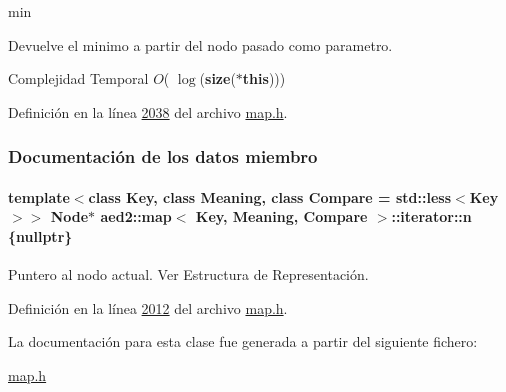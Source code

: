 min 

Devuelve el minimo a partir del nodo pasado como parametro.


\begin{DoxyDescription}
\item[Complejidad Temporal]$O$( $\log$({\bfseries size}({\bfseries $\ast$this})))
\end{DoxyDescription}

Definición en la línea \hyperlink{map_8h_source_l02038}{2038} del archivo \hyperlink{map_8h_source}{map.\+h}.



\subsubsection{Documentación de los datos miembro}
\paragraph[{\texorpdfstring{n}{n}}]{\setlength{\rightskip}{0pt plus 5cm}template$<$class Key, class Meaning, class Compare = std\+::less$<$\+Key$>$$>$ Node$\ast$ {\bf aed2\+::map}$<$ Key, Meaning, Compare $>$\+::iterator\+::n \{nullptr\}\hspace{0.3cm}{\ttfamily [private]}}\hypertarget{classaed2_1_1map_1_1iterator_adf8633ef71bb6c1fc01c0abe8728fd93_adf8633ef71bb6c1fc01c0abe8728fd93}{}\label{classaed2_1_1map_1_1iterator_adf8633ef71bb6c1fc01c0abe8728fd93_adf8633ef71bb6c1fc01c0abe8728fd93}


Puntero al nodo actual. Ver Estructura de Representación. 



Definición en la línea \hyperlink{map_8h_source_l02012}{2012} del archivo \hyperlink{map_8h_source}{map.\+h}.



La documentación para esta clase fue generada a partir del siguiente fichero\+:\begin{DoxyCompactItemize}
\item 
\hyperlink{map_8h}{map.\+h}\end{DoxyCompactItemize}
